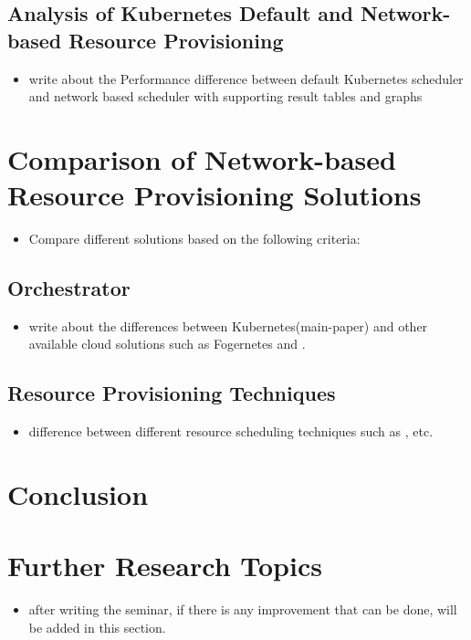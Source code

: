 \subsection{Analysis of Kubernetes Default and Network-based Resource Provisioning}
\label{sec:analysis}
\begin{itemize}
  \item write about the Performance difference between default Kubernetes scheduler and network based scheduler with supporting result tables and graphs
\end{itemize}

\section{Comparison of Network-based Resource Provisioning Solutions}
\label{sec:related_work}
\begin{itemize}
  \item Compare different solutions based on the following criteria:
\end{itemize}

\subsection{Orchestrator}
\label{sec:infra}
\begin{itemize}
  \item write about the differences between Kubernetes(main-paper)\cite{Santos2019} and other available cloud solutions such as Fogernetes\cite{Wobker2018} and \cite{Reale}.
\end{itemize}

\subsection{Resource Provisioning Techniques}
\begin{itemize}
  \item difference between different resource scheduling techniques such  as \cite{Bittencourt2017}, \cite{Haja2019} etc.
\end{itemize}

\section{Conclusion}
\label{sec:concl}

\section{Further Research Topics}
\label{sec:research}
\begin{itemize}
  \item after writing the seminar, if there is any improvement that can be done, will be added in this section.
\end{itemize}
